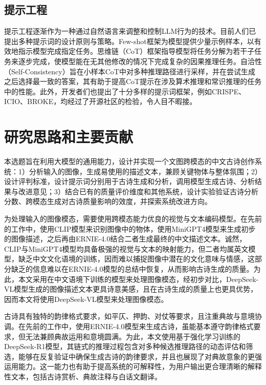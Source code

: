 \subsection{提示工程}
提示工程逐渐作为一种通过自然语言来调整和控制LLM行为的技术。目前人们已提出多种提示词的设计原则与策略。Few-shot框架\cite{brownLanguageModelsAre2020}为模型提供少量示例样本，以有效地指示模型完成指定任务。思维链（CoT）框架\cite{weiChainofThoughtPromptingElicits2022}指导模型将任务分解为若干子任务来逐步完成，使模型能在无其他修改的情况下完成复杂的因果推理任务。自洽性（Self-Consistency）\cite{wangSelfConsistencyImprovesChain2023a}旨在小样本CoT中对多种推理路径进行采样，并在尝试生成之后选择最一致的答案，其有助于提高CoT提示在涉及算术推理和常识推理的任务中的性能。此外，开发者们也提出了十分多样的提示词框架，例如CRISPE、ICIO、BROKE，均经过了开源社区的检验，令人目不暇接。

\section{研究思路和主要贡献}

本选题旨在利用大模型的通用能力，设计并实现一个文图跨模态的中文古诗创作系统：1）分析输入的图像，生成易使用的描述文本，兼顾关键物体与整体氛围；2）设计评判标准，设计提示词分别用于古诗生成和分析，调用模型生成古诗、分析结果与改进意见；3）结合已有的质量评价维度和其他系统，设计实验验证古诗分析分数、跨模态生成对古诗质量影响的效度，并探索系统改进方向。

为处理输入的图像模态，需要使用跨模态能力优良的视觉与文本编码模型。在先前的工作中，使用CLIP模型来识别图像中的物体，使用MiniGPT4模型来生成初步的图像描述，之后再由ERNIE-4.0结合二者生成最终的中文描述文本。诚然，CLIP与MiniGPT4模型均具备极强的视觉与文本的映射能力，但二者均属英文模型，缺乏中文文化语境的训练，因而难以捕捉图像中潜在的文化意味与情感，这部分缺乏的信息难以在ERNIE-4.0模型的总结中恢复，从而影响古诗生成的质量。为此，本文采用在中文语境下训练的模型来处理图像模态，经初步对比，DeepSeek-VL模型生成的图像描述文本更具诗意美感，且在古诗生成的质量上也更具优势，因而本文将使用DeepSeek-VL模型来处理图像模态。

古诗具有独特的韵律格式要求，如平仄、押韵、对仗等要求，且注重典故与意境协调。在先前的工作中，使用ERNIE-4.0模型来生成古诗，虽能基本遵守韵律格式要求，但无法兼顾典故运用和意境圆满。为此，本文使用基于强化学习训练的DeepSeek-R1模型，其链式的推理过程包含对多种候选推理路径的动态评估和筛选，能够在反复验证中确保生成古诗的韵律要求，并且也展现了对典故意象的更强运用能力。这一能力也有助于提高系统的可解释性，为用户输出更合理清晰的解释性文本，包括古诗赏析、典故注释与白话文翻译。

